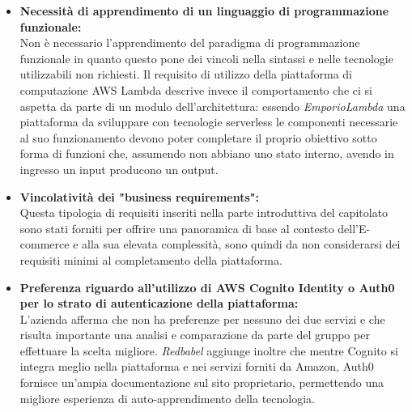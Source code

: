 \begin{itemize}
\item \textbf{Necessità di apprendimento di un linguaggio di programmazione funzionale:} \\
Non è necessario l'apprendimento del paradigma di programmazione funzionale in quanto questo pone dei vincoli nella sintassi e nelle tecnologie utilizzabili non richiesti. Il requisito di utilizzo della piattaforma di computazione AWS Lambda descrive invece il comportamento che ci si aspetta da parte di un modulo dell'architettura: essendo \textit{EmporioLambda} una piattaforma da sviluppare con tecnologie serverless le componenti necessarie al suo funzionamento devono poter completare il proprio obiettivo sotto forma di funzioni che, assumendo non abbiano uno stato interno, avendo in ingresso un input producono un output.
\item \textbf{Vincolatività dei "business requirements":} \\
Questa tipologia di requisiti inseriti nella parte introduttiva del capitolato sono stati forniti per offrire una panoramica di base al contesto dell'E-commerce e alla sua elevata complessità, sono quindi da non considerarsi dei requisiti minimi al completamento della piattaforma.
\item \textbf{Preferenza riguardo all'utilizzo di AWS Cognito Identity o Auth0 per lo strato di autenticazione della piattaforma:} \\
L'azienda afferma che non ha preferenze per nessuno dei due servizi e che risulta importante una analisi e comparazione da parte del gruppo per effettuare la scelta migliore. \textit{Redbabel} aggiunge inoltre che mentre Cognito si integra meglio nella piattaforma e nei servizi forniti da Amazon, Auth0 fornisce un'ampia documentazione sul sito proprietario, permettendo una migliore esperienza di auto-apprendimento della tecnologia.
\end{itemize}

